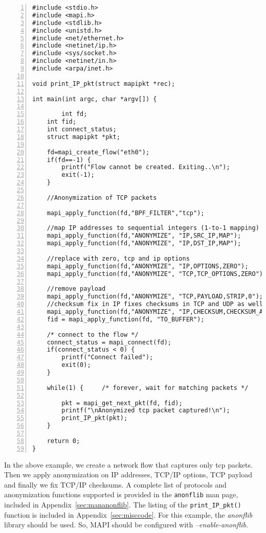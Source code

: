 \documentclass[a4paper, 11pt]{article}
\begin{document}
\begin{Verbatim}[numbersep=12pt, numbers=left, baselinestretch=1.0, fontsize=\small]
#include <stdio.h>
#include <mapi.h>
#include <stdlib.h>
#include <unistd.h>
#include <net/ethernet.h>
#include <netinet/ip.h>
#include <sys/socket.h>
#include <netinet/in.h>
#include <arpa/inet.h>

void print_IP_pkt(struct mapipkt *rec);

int main(int argc, char *argv[]) {

        int fd;
	int fid;
	int connect_status;
	struct mapipkt *pkt;	

	fd=mapi_create_flow("eth0");
	if(fd==-1) {
	    printf("Flow cannot be created. Exiting..\n");
	    exit(-1);
	}

	//Anonymization of TCP packets

	mapi_apply_function(fd,"BPF_FILTER","tcp");

	//map IP addresses to sequential integers (1-to-1 mapping)
	mapi_apply_function(fd,"ANONYMIZE", "IP,SRC_IP,MAP");
	mapi_apply_function(fd,"ANONYMIZE", "IP,DST_IP,MAP");

	//replace with zero, tcp and ip options
	mapi_apply_function(fd,"ANONYMIZE", "IP,OPTIONS,ZERO");
	mapi_apply_function(fd,"ANONYMIZE", "TCP,TCP_OPTIONS,ZERO");

	//remove payload
	mapi_apply_function(fd,"ANONYMIZE", "TCP,PAYLOAD,STRIP,0");
	//checksum fix in IP fixes checksums in TCP and UDP as well
	mapi_apply_function(fd,"ANONYMIZE", "IP,CHECKSUM,CHECKSUM_ADJUST");
	fid = mapi_apply_function(fd, "TO_BUFFER");

	/* connect to the flow */
	connect_status = mapi_connect(fd);
	if(connect_status < 0) {
		printf("Connect failed");
		exit(0);
	}

	while(1) {     /* forever, wait for matching packets */
		
		pkt = mapi_get_next_pkt(fd, fid);
		printf("\nAnonymized tcp packet captured!\n");
		print_IP_pkt(pkt);
	}

	return 0;
}
\end{Verbatim}


In the above example, we create a network flow that captures only tcp packets. Then we apply anonymization
on IP addresses, TCP/IP options, TCP payload and finally we fix TCP/IP checksums. A complete list of
protocols and anonymization functions supported
is provided in the {\tt anonflib} man page, included in
Appendix~\ref{sec:mananonflib}.
The listing of the {\tt print\_IP\_pkt()} function
is included in Appendix~\ref{sec:misccode}.
For this example, the \textit{anonflib} library should be used.
So, MAPI should be configured with \textit{--enable-anonflib}.
\end{document}
